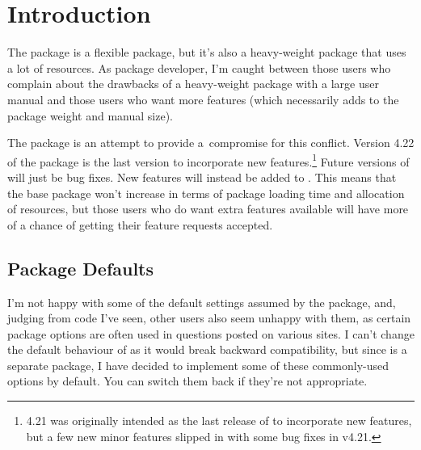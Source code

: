 \documentclass[report,inlinetitle,widecs]{nlctdoc}
\begin{document}
\tableofcontents

\chapter{Introduction}
\label{sec:intro}

The  package is a flexible package, but it's also a
heavy-weight package that uses a lot of resources. As package
developer, I'm caught between those users who complain about the
drawbacks of a heavy-weight package with a large user manual and
those users who want more features (which necessarily adds to the
package weight and manual size).

The  package is an attempt to provide
a~compromise for this
conflict. Version 4.22 of the  package is
the last version to incorporate new features.\footnote{4.21 was
originally intended as the last release of  to
incorporate new features, but a few new minor features slipped in with
some bug fixes in v4.21.} Future versions of
 will just be bug fixes. New features will
instead be added to .
This means that the base  package won't increase
in terms of package loading time and allocation of resources, but
those users who do want extra features available will have more of a
chance of getting their feature requests accepted.

\section{Package Defaults}
\label{sec:defaults}

I'm not happy with some of the default settings assumed by the
 package, and, judging from code I've seen, other
users also seem unhappy with them, as certain package options are
often used in questions posted on various sites. I can't change the default
behaviour of  as it would break backward
compatibility, but since  is a separate
package, I have decided to implement some of these commonly-used 
options by default. You can switch them back if they're not 
appropriate.
\end{document}
